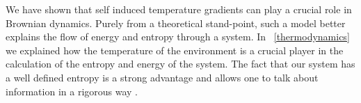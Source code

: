 We have shown that self induced temperature gradients can play a crucial role in Brownian dynamics. Purely from a theoretical stand-point, such a model better explains the flow of energy and entropy through a system. In ~\autoref{thermodynamics} we explained how the temperature of the environment is a crucial player in the calculation of the entropy and energy of the system. The fact that our system has a well defined entropy is a strong advantage and allows one to talk about information in a rigorous way \cite{Landauer1961,MyersCelebranoKrishnan2015}.